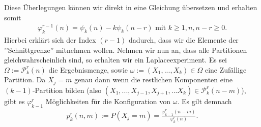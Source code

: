 \documentclass{article}
\begin{document}
Diese Überlegungen können wir direkt in eine Gleichung übersetzen und erhalten somit
\begin{align*}
    \varphi_k^{r-1}(n) = \psi_k(n) - k\psi_k(n-r) \text{ mit } k \geq 1, n, n-r \geq 0.
\end{align*}
Hierbei erklärt sich der Index $(r-1)$ dadurch, dass wir die Elemente der ’’Schnittgrenze'' mitnehmen wollen.
Nehmen wir nun an, dass alle Partitionen gleichwahrscheinlich sind, so erhalten wir ein Laplaceexperiment. Es sei $\Omega := \mathcal{P}_k^r(n)$ die Ergebnismenge, sowie $\omega:=(X_1,...,X_k) \in \Omega$ eine Zufällige Partition. Da $X_j=m$ genau dann wenn die restlichen Komponenten eine $(k-1)$-Partition bilden (also $(X_1,...,X_{j-1}, X_{j+1},...X_k) \in \mathcal{P}_k^r(n-m)$), gibt es $\varphi_{k-1}^r$ Möglichkeiten für die Konfiguration von $\omega$. Es gilt demnach
\begin{align}
    p_k^r(n,m) := P(X_j=m) = \frac{\varphi_{k-1}^r(n-m)}{\varphi_k^r(n)} \label{eq:probability_phi}.
\end{align}
\end{document}
